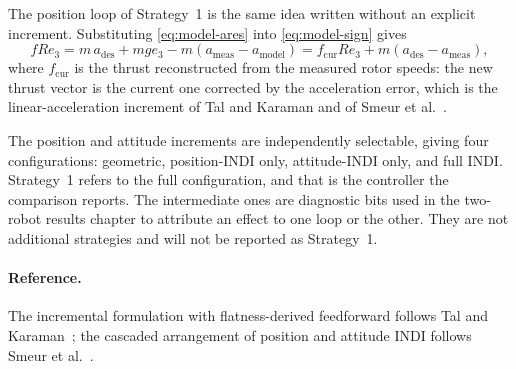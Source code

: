 The position loop of Strategy~1 is the same idea written without an explicit increment.
Substituting \eqref{eq:model-ares} into \eqref{eq:model-sign} gives
\begin{equation*}
  f R e_3 = m\,a_{\mathrm{des}} + mg e_3 - m\left(a_{\mathrm{meas}} - a_{\mathrm{model}}\right)
          = f_{\mathrm{cur}} R e_3 + m\left(a_{\mathrm{des}} - a_{\mathrm{meas}}\right),
\end{equation*}
where $f_{\mathrm{cur}}$ is the thrust reconstructed from the measured rotor speeds: the new thrust
vector is the current one corrected by the acceleration error, which is the linear-acceleration
increment of Tal and Karaman and of Smeur et al.~\cite{tal2018indi,smeur2017cascadedindi}.

The position and attitude increments are independently selectable, giving four configurations:
geometric, position-INDI only, attitude-INDI only, and full INDI. Strategy~1 refers to the full
configuration, and that is the controller the comparison reports. The intermediate ones are
diagnostic bits used in the two-robot results chapter to attribute an effect to one loop or the
other. They are not additional strategies and will not be reported as Strategy~1.

\paragraph{Reference.} The incremental formulation with flatness-derived
feedforward follows Tal and Karaman~\cite{tal2018indi}; the cascaded arrangement of position and
attitude INDI follows Smeur et al.~\cite{smeur2017cascadedindi}.


